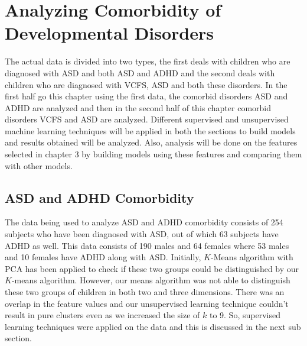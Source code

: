 \chapter{Analyzing Comorbidity of Developmental Disorders }
The actual data is divided into two types, the first deals with children who are diagnosed with ASD and both ASD and ADHD and the second deals with children who are diagnosed with VCFS, ASD and both these disorders. In the first half go this chapter using the first data, the comorbid disorders ASD and ADHD are analyzed and then in the second half of this chapter comorbid disorders VCFS and ASD are analyzed. Different supervised and unsupervised machine learning techniques will be applied in both the sections to build models and results obtained will be analyzed. Also, analysis will be done on the features selected in chapter 3 by building models using these features and comparing them with other models. 
\section{ASD and ADHD Comorbidity}
The data being used to analyze ASD and ADHD comorbidity consists of 254 subjects who have been diagnosed with ASD, out of which 63 subjects have ADHD as well. This data consists of 190 males and 64 females where 53 males and 10 females have ADHD along with ASD. Initially, $K$-Means algorithm with PCA has been applied to check if these two groups could be distinguished by our $K$-means algorithm. However, our means algorithm was not able to distinguish these two groups of children in both two and three dimensions. There was an overlap in the feature values and our unsupervised learning technique couldn’t result in pure clusters even as we increased the size of $k$ to 9. So, supervised learning techniques were applied on the data and this is discussed in the next sub section.

